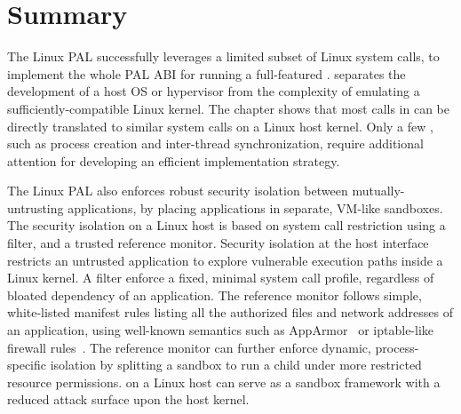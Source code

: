 \section{Summary}



The Linux PAL successfully leverages a limited subset of Linux system calls,
to implement the whole PAL ABI for running a
full-featured \libos{}.
\Thehostabi{} separates the development of a host OS or hypervisor
from the complexity of emulating a sufficiently-compatible
Linux kernel.
The chapter shows that most calls in \thehostabi{}
can be directly translated to similar system calls on a Linux host kernel.
Only a few \hostapis{}, such as process creation and inter-thread synchronization, require additional attention for developing an efficient implementation strategy.



The Linux PAL also enforces robust security isolation
between mutually-untrusting applications,
by placing applications in separate, VM-like sandboxes.
The security isolation on a Linux host is based on system call restriction using a \seccomp{} filter, and a trusted reference monitor. %
Security isolation at the host interface
restricts an untrusted application to explore vulnerable execution paths
inside a Linux kernel.
A \seccomp{} filter 
enforce a fixed, minimal system call profile, regardless of bloated dependency of an application.
The reference monitor follows
simple, white-listed manifest rules listing 
all the authorized files and network addresses of an application,
using well-known semantics
such as AppArmor~\cite{apparmor} or iptable-like firewall rules~\cite{iptablesman}.
The reference monitor can further enforce dynamic, process-specific isolation by splitting a sandbox
to run a child \picoproc{} under more restricted
resource permissions.
\graphene{} on a Linux host can serve as a sandbox framework
with a reduced attack surface
upon the host kernel.






